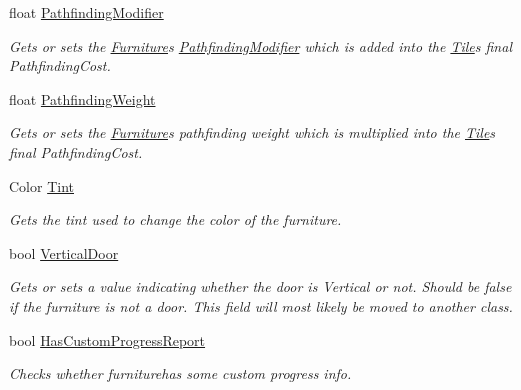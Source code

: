 \begin{DoxyCompactItemize}
\item 
float \hyperlink{class_furniture_a6a6f7f0e402f354adf5aa1d3125ef364}{Pathfinding\+Modifier}
\begin{DoxyCompactList}\small\item\em Gets or sets the \hyperlink{class_furniture}{Furniture}\textquotesingle{}s \hyperlink{class_furniture_a6a6f7f0e402f354adf5aa1d3125ef364}{Pathfinding\+Modifier} which is added into the \hyperlink{class_tile}{Tile}\textquotesingle{}s final Pathfinding\+Cost. \end{DoxyCompactList}\item 
float \hyperlink{class_furniture_a8c6a8f93acbcc055d88fe8cee68713d0}{Pathfinding\+Weight}
\begin{DoxyCompactList}\small\item\em Gets or sets the \hyperlink{class_furniture}{Furniture}\textquotesingle{}s pathfinding weight which is multiplied into the \hyperlink{class_tile}{Tile}\textquotesingle{}s final Pathfinding\+Cost. \end{DoxyCompactList}\item 
Color \hyperlink{class_furniture_a41508df7e9308f8b1afaadbc73decb14}{Tint}
\begin{DoxyCompactList}\small\item\em Gets the tint used to change the color of the furniture. \end{DoxyCompactList}\item 
bool \hyperlink{class_furniture_ad071451038dfba3b911fee3067ea4981}{Vertical\+Door}
\begin{DoxyCompactList}\small\item\em Gets or sets a value indicating whether the door is Vertical or not. Should be false if the furniture is not a door. This field will most likely be moved to another class. \end{DoxyCompactList}\item 
bool \hyperlink{class_furniture_abf3299bf6129c3fff38397c232dba291}{Has\+Custom\+Progress\+Report}
\begin{DoxyCompactList}\small\item\em Checks whether furniturehas some custom progress info. \end{DoxyCompactList}\item 

\end{DoxyCompactItemize}
